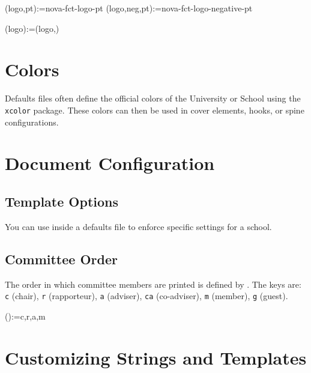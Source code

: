 \begin{ltx}
\school(logo,pt):={nova-fct-logo-pt}
\school(logo,neg,pt):={nova-fct-logo-negative-pt}

\school(logo):={\theschool(logo,\@LANG@COVER)}
\end{ltx}

\section{Colors}
\label{sec:colors}

Defaults files often define the official colors of the University or School using the \texttt{xcolor} package. These colors can then be used in cover elements, hooks, or spine configurations.

\begin{ltx}
\end{ltx}

\section{Document Configuration}
\label{sec:config}

\subsection{Template Options}
You can use \latexinline{\ntsetup} inside a defaults file to enforce specific settings for a school.

\begin{ltx}
\end{ltx}

\subsection{Committee Order}
The order in which committee members are printed is defined by \latexinline{\committeeorder}. The keys are: \texttt{c} (chair), \texttt{r} (rapporteur), \texttt{a} (adviser), \texttt{ca} (co-adviser), \texttt{m} (member), \texttt{g} (guest).

\begin{ltx}
\committeeorder():={c,r,a,m}%
\end{ltx}

\section{Customizing Strings and Templates}
\label{sec:strings}

